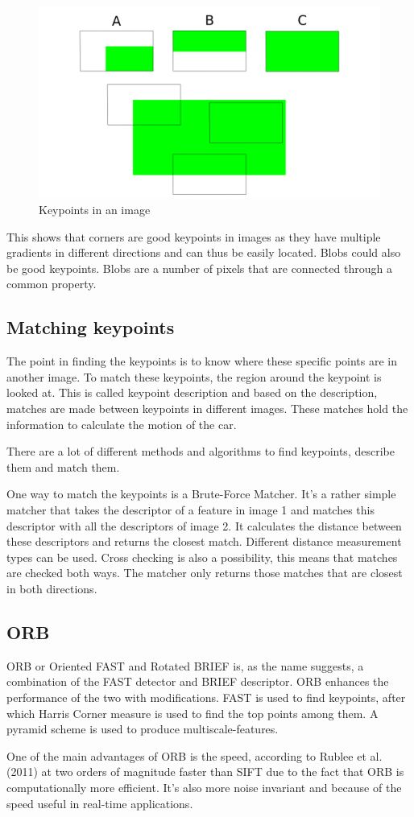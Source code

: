 \begin{figure}
    \centering
    \includegraphics[width=1\textwidth]{figures/features.png}
    \caption{Keypoints in an image}
    \label{fig:features}
\end{figure}

This shows that corners are good keypoints in images as they have multiple gradients in different directions and can thus be easily located. Blobs could also be good keypoints. Blobs are a number of pixels that are connected through a common property.

\subsection{Matching keypoints}
The point in finding the keypoints is to know where these specific points are in another image. To match these keypoints, the region around the keypoint is looked at. This is called keypoint description and based on the description, matches are made between keypoints in different images. These matches hold the information to calculate the motion of the car.\bigskip

There are a lot of different methods and algorithms to find keypoints, describe them and match them.\bigskip

One way to match the keypoints is a Brute-Force Matcher. It's a rather simple matcher that takes the descriptor of a feature in image 1 and matches this descriptor with all the descriptors of image 2. It calculates the distance between these descriptors and returns the closest match. Different distance measurement types can be used. Cross checking is also a possibility, this means that matches are checked both ways. The matcher only returns those matches that are closest in both directions.

\subsection{ORB}
ORB or Oriented FAST and Rotated BRIEF is, as the name suggests, a combination of the FAST detector and BRIEF descriptor. ORB enhances the performance of the two with modifications. FAST is used to find keypoints, after which Harris Corner measure is used to find the top points among them. A pyramid scheme is used to produce multiscale-features. \bigskip 

One of the main advantages of ORB is the speed, according to Rublee et al. (2011) \cite{6126544} at two orders of magnitude faster than SIFT due to the fact that ORB is computationally more efficient. It's also more noise invariant and because of the speed useful in real-time applications.